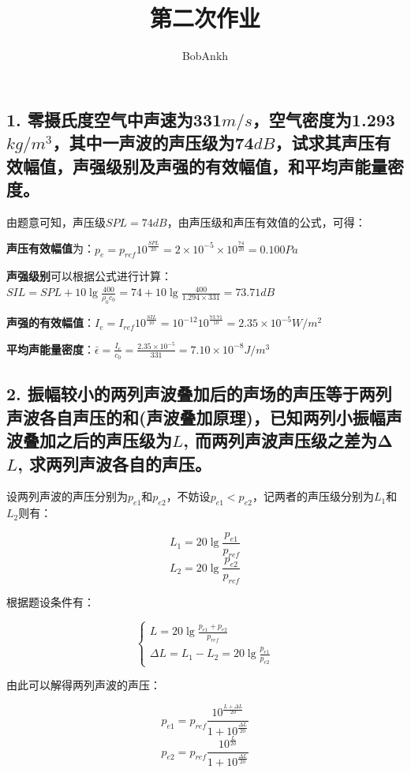 \documentclass[]{article}
\title{第二次作业}
\author{BobAnkh}
\date{}
\begin{document}
\maketitle

\hypertarget{header-n80}{%
\subsection{1.	零摄氏度空气中声速为331$m/s$，空气密度为1.293$kg/m^3$，其中一声波的声压级为74$dB$，试求其声压有效幅值，声强级别及声强的有效幅值，和平均声能量密度。}\label{header-n80}}

由题意可知，声压级$SPL=74dB$，由声压级和声压有效值的公式，可得：

\textbf{声压有效幅值}为：$p_e=p_{ref}10^{\frac{SPL}{20}}=2\times 10^{-5}\times 10^{\frac{74}{20}}=0.100Pa$

\textbf{声强级别}可以根据公式进行计算：$SIL=SPL+10\lg\frac{400}{\rho_0c_0}=74+10\lg \frac{400}{1.294\times 331}=73.71dB$

\textbf{声强的有效幅值}：$I_e=I_{ref}10^{\frac{SIL}{10}}=10^{-12}10^{\frac{73.71}{10}}=2.35\times 10^{-5}W/m^2$

\textbf{平均声能量密度}：$\bar{\epsilon}=\frac{I_e}{c_0}=\frac{2.35\times 10^{-5}}{331}=7.10\times 10^{-8} J/m^3$

\hypertarget{header-n87}{%
\subsection{2. 振幅较小的两列声波叠加后的声场的声压等于两列声波各自声压的和(声波叠加原理)，已知两列小振幅声波叠加之后的声压级为$L$, 而两列声波声压级之差为Δ$L$, 求两列声波各自的声压。}\label{header-n87}}

设两列声波的声压分别为$p_{e1}$和$p_{e2}$，不妨设$p_{e1}<p_{e2}$，记两者的声压级分别为$L_1$和$L_2$则有：

$$L_1=20\lg\frac{p_{e1}}{p_{ref}}$$
$$L_2=20\lg\frac{p_{e2}}{p_{ref}}$$

根据题设条件有：

$$\begin{cases}L=20\lg\frac{p_{e1}+p_{e2}}{p_{ref}} \\ \Delta L=L_1-L_2=20\lg\frac{p_{e1}}{p_{e2}}\end{cases}$$

由此可以解得两列声波的声压：

$$p_{e1}=p_{ref}\frac{10^{\frac{L+\Delta L}{20}}}{1+10^{\frac{\Delta L}{20}}}$$
$$p_{e2}=p_{ref}\frac{10^{\frac{L}{20}}}{1+10^{\frac{\Delta L}{20}}}$$
\end{document}
